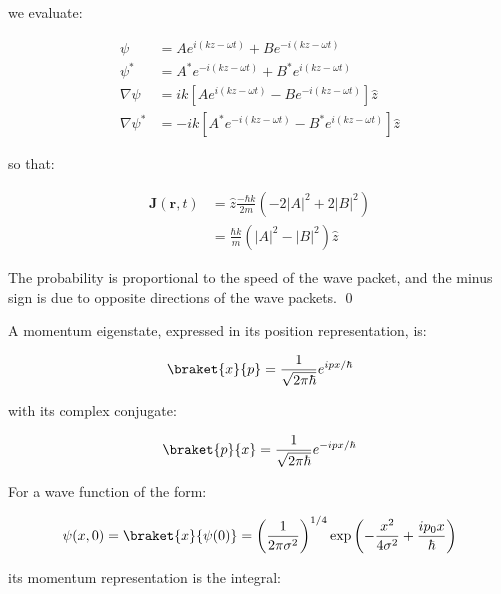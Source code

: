 \documentclass[12pt]{article}
\begin{document}
we evaluate:

\begin{equation}
\begin{split}
    \psi &= A e^{i(kz - \omega t)} + B e^{-i(kz - \omega t)} \\
    \psi^{*} &= A^{*} e^{-i(kz - \omega t)} + B^{*} e^{i(kz - \omega t)} \\
    \nabla \psi &= ik \left[ A e^{i(kz - \omega t)} - B e^{-i(kz - \omega t)} \right] \hat{z} \\
    \nabla \psi^{*} &= -ik \left[ A^{*} e^{-i(kz - \omega t)} - B^{*} e^{i(kz - \omega t)} \right] \hat{z}
\end{split}
\end{equation}

so that:

\begin{equation}
\begin{split}
    \mathbf{J}(\mathbf{r}, t) &= \hat{z} \frac{-\hbar k}{2m} \left( -2\left\lvert A \right\rvert^{2} + 2\left\lvert B \right\rvert^{2} \right) \\
    &= \frac{\hbar k}{m} \left( \left\lvert A \right\rvert^{2} - \left\lvert B \right\rvert^{2} \right) \hat{z}
\end{split}
\end{equation}

The probability is proportional to the speed of the wave packet, and the minus sign is due to opposite directions of the wave packets.
\qed


A momentum eigenstate, expressed in its position representation, is:

\begin{equation}
    \braket{x}{p} = \frac{1}{\sqrt{2\pi\hbar}} e^{ipx/\hbar}
\end{equation}

with its complex conjugate:

\begin{equation}
    \braket{p}{x} = \frac{1}{\sqrt{2\pi\hbar}} e^{-ipx/\hbar}
\end{equation}

For a wave function of the form:

\begin{equation}
    \psi(x, 0) = \braket{x}{\psi(0)} = \left( \frac{1}{2\pi \sigma^{2}} \right)^{1/4} \exp \left( -\frac{x^{2}}{4\sigma^{2}} + \frac{ip_{0}x}{\hbar} \right)
\end{equation}

its momentum representation is the integral:
\end{document}
